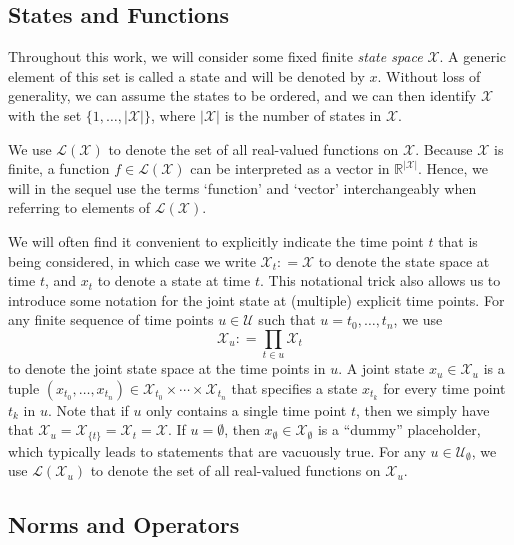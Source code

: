 \documentclass[10pt,a4paper]{paper}
\theoremstyle{definition}
\newcommand{\reals}{\mathbb{R}}
\newcommand{\states}{\mathcal{X}}
\newcommand{\gambles}{\mathcal{L}}
\newcommand{\gamblesX}{\gambles(\states)}
\newcommand{\abs}[1]{\left\vert #1 \right\vert}
\newcommand{\coloneqq}{:\!=}
\begin{document}
\subsection{States and Functions}\label{sec:multivar_notation}

Throughout this work, we will consider some fixed finite \emph{state space} $\states$. A generic element of this set is called a state and will be denoted by $x$. Without loss of generality, we can assume the states to be ordered, and we can then identify $\states$ with the set $\{1,\dots,\abs{\states}\}$, where $\abs{\states}$ is the number of states in $\states$. \label{notation:statespace}

We use $\gamblesX$ to denote the set of all real-valued functions on $\states$. Because $\states$ is finite, a function $f\in\gamblesX$ can be interpreted as a vector in $\reals^{\abs{\states}}$. Hence, we will in the sequel use the terms `function' and `vector' interchangeably when referring to elements of $\gamblesX$. \label{notation:functionspace}

We will often find it convenient to explicitly indicate the time point $t$ that is being considered, in which case we write $\states_t\coloneqq\states$ to denote the state space at time $t$, and $x_t$ to denote a state at time $t$. This notational trick also allows us to introduce some notation for the joint state at (multiple) explicit time points. For any finite sequence of time points $u\in\mathcal{U}$ such that $u=t_0,\ldots,t_n$, we use
\begin{equation*}
\states_u \coloneqq \prod_{t\in u}\states_t
\end{equation*}
to denote the joint state space at the time points in $u$. A joint state $x_u\in\states_u$ is a tuple $(x_{t_0},\ldots,x_{t_n})\in\states_{t_0}\times\cdots\times\states_{t_n}$ that specifies a state $x_{t_k}$ for every time point $t_k$ in $u$. Note that if $u$ only contains a single time point $t$, then we simply have that $\states_u=\states_{\{t\}}=\states_t=\states$. If $u=\emptyset$, then $x_\emptyset\in\states_\emptyset$ is a ``dummy'' placeholder, which typically leads to statements that are vacuously true. 
For any $u\in\mathcal{U}_\emptyset$, we use $\gambles(\states_u)$ to denote the set of all real-valued functions on $\states_u$. \label{notation:functionspacemulti}

 

\subsection{Norms and Operators}\label{sec:func_oper_norm}
\end{document}
